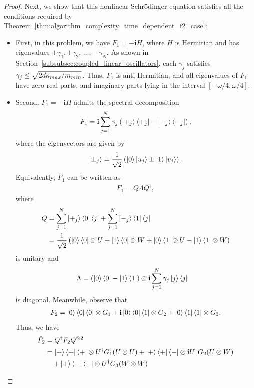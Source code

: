\documentclass[10pt,a4paper]{amsart}
\theoremstyle{plain}
\theoremstyle{definition}
\theoremstyle{remark}
\newcommand{\lrb}[1]{\left ( #1 \right )}
\renewcommand{\i}{\ensuremath{\mathbf{i}}}
\begin{document}
\begin{proof}
Next, we show that this nonlinear Schr\"{o}dinger equation satisfies all the conditions required by Theorem~\ref{thm:algorithm_complexity_time_dependent_f2_case}:
\begin{itemize}
\item First, in this problem, we have $F_1=-\i H$, where $H$ is Hermitian and has
eigenvalues $\pm \gamma_1, \pm \gamma_2$, $\dots$, $\pm \gamma_N$. As shown in Section~\ref{subsubsec:coupled_linear_oscillators}, each $\gamma_j$ satisfies $\gamma_j\le \sqrt{2 d \kappa_{\rm max} / m_{\rm min}}$. Thus, $F_1$ is anti-Hermitian, and all eigenvalues of $F_1$ have zero real parts, and imaginary parts lying in the interval $[-\omega/4, \omega/4]$.
\item Second, $F_1=-\i H$ admits the spectral decomposition
\begin{align}
    F_1 = \i\sum_{j=1}^N \gamma_j \lrb{\ket{+_j}\bra{+_j} - \ket{-_j}\bra{-_j}},    
\end{align}
where the eigenvectors are given by
\begin{align}
    \ket{\pm_j}=\frac{1}{\sqrt{2}}\lrb{\ket{0}\ket{u_j}\pm \ket{1}\ket{v_j}}.
\end{align}
Equivalently, $F_1$ can be written as 
\begin{align}
    F_1 = Q \Lambda Q^\dagger,
\end{align}
where
\begin{align}
Q &= 
\sum_{j=1}^N \ket{+_j}\bra{0}\bra{j}
+
\sum_{j=1}^N \ket{-_j}\bra{1}\bra{j} \\
&=\frac{1}{\sqrt{2}}\lrb{\ket{0}\bra{0}\otimes U+\ket{1}\bra{0}\otimes W+\ket{0}\bra{1}\otimes U-\ket{1}\bra{1}\otimes W}
\end{align}
is unitary and
\begin{align}
\Lambda &= \lrb{\ket{0}\bra{0} - \ket{1}\bra{1}} \otimes \i 
 \sum_{j=1}^N \gamma_j \ket{j}\bra{j}        
\end{align}
is diagonal. Meanwhile, observe that
\begin{align}
F_2 = \ket{0}\bra{0}\bra{0}\otimes G_1
    +\i\ket{0}\bra{0}\bra{1}\otimes G_2
    +\ket{0}\bra{1}\bra{1}\otimes G_3.    
\end{align}
Thus, we have
\begin{align}
\tilde{F}_2 & = Q^\dagger F_2 Q^{\otimes 2} \\
&=\ket{+}\bra{+}\bra{+} \otimes U^\dagger G_1 (U \otimes U)  +\ket{+}\bra{+}\bra{-} \otimes \i U^\dagger G_2 (U \otimes W) \nonumber\\
&\quad +\ket{+}\bra{-}\bra{-} \otimes U^\dagger G_3 (W \otimes W) \\

\end{align}
\end{itemize}
\end{proof}
\end{document}
